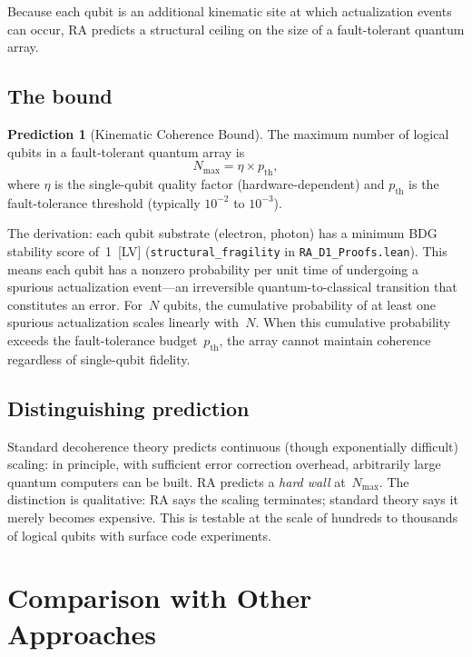 \documentclass[11pt,a4paper]{article}
\theoremstyle{plain}
\theoremstyle{definition}
\newtheorem{prediction}[theorem]{Prediction}
\theoremstyle{remark}
\begin{document}
Because each qubit is an additional kinematic site at which actualization events can
occur, RA predicts a structural ceiling on the size of a fault-tolerant quantum array.

\subsection{The bound}\label{sec:kcb-bound}

\begin{prediction}[Kinematic Coherence Bound]\label{pred:kcb}
The maximum number of logical qubits in a fault-tolerant quantum array is
\begin{equation}
N_{\max} = \eta \times p_{\mathrm{th}},
\label{eq:kcb}
\end{equation}
where $\eta$ is the single-qubit quality factor (hardware-dependent) and
$p_{\mathrm{th}}$ is the fault-tolerance threshold (typically $10^{-2}$ to
$10^{-3}$).
\end{prediction}

The derivation: each qubit substrate (electron, photon) has a minimum BDG stability
score of~1~[LV] (\texttt{structural\_fragility} in \texttt{RA\_D1\_Proofs.lean}).
This means each qubit has a nonzero probability per unit time of undergoing a
spurious actualization event---an irreversible quantum-to-classical transition that
constitutes an error.  For~$N$ qubits, the cumulative probability of at least one
spurious actualization scales linearly with~$N$.  When this cumulative probability
exceeds the fault-tolerance budget~$p_{\mathrm{th}}$, the array cannot maintain
coherence regardless of single-qubit fidelity.

\subsection{Distinguishing prediction}\label{sec:kcb-distinction}

Standard decoherence theory predicts continuous (though exponentially difficult)
scaling: in principle, with sufficient error correction overhead, arbitrarily large
quantum computers can be built.  RA predicts a \emph{hard wall} at~$N_{\max}$.  The
distinction is qualitative: RA says the scaling terminates; standard theory says it
merely becomes expensive.  This is testable at the scale of hundreds to thousands of
logical qubits with surface code experiments.

\section{Comparison with Other Approaches}\label{sec:comparison}
\end{document}
